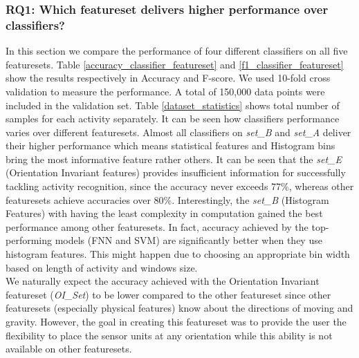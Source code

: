 \documentclass[journal,article,submit,moreauthors,pdftex]{Definitions/mdpi}
\begin{document}
\subsubsection{RQ1: Which featureset delivers higher performance over classifiers?}
In this section we compare the performance of four different classifiers on all five featuresets. Table \ref{accuracy_classifier_featureset} and \ref{f1_classifier_featureset} show the results respectively in Accuracy and F-score. We used 10-fold cross validation to measure the performance. A total of 150,000 data points were included in the validation set. Table \ref{dataset_statistics} shows total number of samples for each activity separately. It can be seen how classifiers performance varies over different featuresets. Almost all classifiers on \textit{set\_B} and \textit{set\_A} deliver their higher performance which means statistical features and Histogram bins bring the most informative feature rather others. It can be seen that the \textit{set\_E} (Orientation Invariant features) provides insufficient information for successfully tackling activity recognition, since the accuracy never exceeds 77\%, whereas other featuresets achieve accuracies over 80\%. Interestingly, the \textit{set\_B} (Histogram Features) with having the least complexity in computation gained the best performance among other featuresets. In fact, accuracy achieved by the top-performing models (FNN and SVM) are significantly better when they use histogram features. This might happen due to choosing an appropriate bin width based on length of activity and windows size.\\
We naturally expect the accuracy achieved with the Orientation Invariant featureset (\textit{OI\_Set}) to be lower	compared to the other featureset since other featuresets (especially physical features) know about the directions of moving and gravity. However, the goal in creating this featureset was to provide the user the flexibility to place the sensor units at any orientation while this ability is not available on other featuresets.
\end{document}
